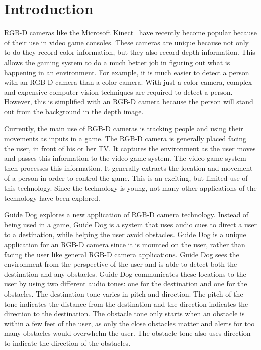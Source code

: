 \section{Introduction}
\label{sec:intro}

RGB-D cameras like the Microsoft Kinect~\cite{kinect-website} have recently
become popular because of their use in video game consoles. These cameras are
unique because not only to do they record color information, but they also record
depth information. This allows the gaming system to do a much better job in
figuring out what is happening in an environment. For example, it is much easier
to detect a person with an RGB-D camera than a color camera. With just a color
camera, complex and expensive computer vision techniques are required to detect
a person. However, this is simplified with an RGB-D camera because the person
will stand out from the background in the depth image.

Currently, the main use of RGB-D cameras is tracking people and using their
movements as inputs in a game. The RGB-D camera is generally placed facing the
user, in front of his or her TV. It captures the environment as the user moves
and passes this information to the video game system. The video game system then
processes this information. It generally extracts the location and movement of a
person in order to control the game. This is an exciting, but limited use of
this technology. Since the technology is young, not many other applications of
the technology have been explored.

Guide Dog explores a new application of RGB-D camera technology. Instead of
being used in a game, Guide Dog is a system that uses audio cues to direct a
user to a destination, while helping the user avoid obstacles. Guide Dog is a
unique application for an RGB-D camera since it is mounted on the user, rather
than facing the user like general RGB-D camera applications. Guide Dog sees the
environment from the perspective of the user and is able to detect both the
destination and any obstacles. Guide Dog communicates these locations to the
user by using two different audio tones: one for the destination and one for the
obstacles. The destination tone varies in pitch and direction. The pitch of the
tone indicates the distance from the destination and the direction indicates the
direction to the destination. The obstacle tone only starts when an obstacle is
within a few feet of the user, as only the close obstacles matter and alerts for too many
obstacles would overwhelm the user. The obstacle tone also uses direction to
indicate the direction of the obstacles.

